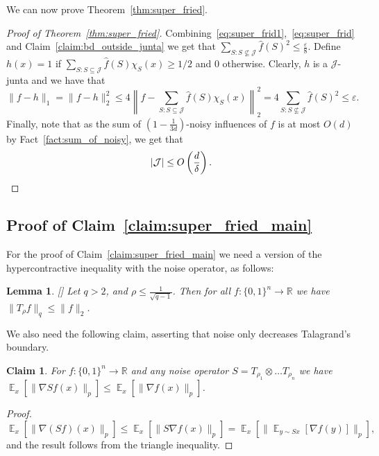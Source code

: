 \documentclass[10pt]{article}
\newcommand{\card}[1]{\left\lvert #1\right\rvert}
\newcommand{\Expect}[2]{{\mathop{\mathbb E}_{#1}\left[#2\right]}}
\newcommand{\norm}[1]{\lVert #1\rVert}
\newcommand{\eps}{\varepsilon}
\newtheorem{lemma}[thm]{Lemma}
\newtheorem{claim}[thm]{Claim}
\begin{document}
  We can now prove Theorem~\ref{thm:super_fried}.
  \begin{proof}[Proof of Theorem~\ref{thm:super_fried}]
    Combining~\eqref{eq:super_frid1},~\eqref{eq:super_frid} and Claim~\ref{claim:bd_outside_junta} we get that
    $\sum\limits_{S: S\not\subseteq \mathcal{J}}\widehat{f}(S)^2\leq \frac{\eps}{8}$.
    Define $h(x) = 1$ if $\sum\limits_{S: S\subseteq \mathcal{J}}\widehat{f}(S)\chi_S(x)\geq 1/2$ and $0$ otherwise.
    Clearly, $h$ is a $\mathcal{J}$-junta and we have that
    \[
    \norm{f-h}_1
    =
    \norm{f-h}_2^2
    \leq 4\left\|f-\sum\limits_{S: S\subseteq \mathcal{J}}\widehat{f}(S)\chi_S(x)\right\|_2^2
    =4\sum\limits_{S: S\not\subseteq \mathcal{J}}\widehat{f}(S)^2\leq \eps.
    \]
    Finally, note that as the sum of $\left(1-\frac{1}{3d}\right)$-noisy influences of $f$ is at most $O(d)$ by Fact~\ref{fact:sum_of_noisy}, we get that
    \[
    \card{\mathcal{J}}\leq O\left(\frac{d}{\delta}\right).
    \qedhere
    \]
  \end{proof}

\subsection{Proof of Claim~\ref{claim:super_fried_main}}\label{sec:missing_proofs}
For the proof of Claim~\ref{claim:super_fried_main} we need a version of the hypercontractive inequality with the noise operator, as follows:
\begin{lemma}\label{lemma:hypercontractivity_noise}[\cite{ODonnell}]
  Let $q>2$, and $\rho\leq \frac{1}{\sqrt{q-1}}$. Then for all $f\colon\{0,1\}^n\to\mathbb{R}$ we have
  $\norm{T_{\rho} f}_q\leq \norm{f}_2$.
\end{lemma}

We also need the following claim, asserting that noise only decreases Talagrand's boundary.
\begin{claim}\label{claim:noise_decreases_tal}
  For $f\colon \{0,1\}^n\to\mathbb{R}$ and any noise operator $S = T_{\rho_1}\otimes\ldots T_{\rho_n}$ we have
  $\Expect{x}{\norm{\nabla{S f}(x)}_p}\leq \Expect{x}{\norm{\nabla{f}(x)}_p}$.
\end{claim}
\begin{proof}
  \[\Expect{x}{\norm{\nabla (S f)(x)}_p}
  \leq
  \Expect{x}{\norm{S \nabla f(x)}_p}
  =\Expect{x}{\norm{\Expect{y\sim S x}{\nabla f(y)}}_p},
  \]
  and the result follows from the triangle inequality.
\end{proof}
\end{document}
